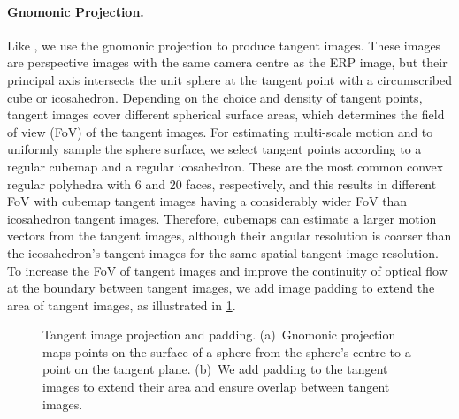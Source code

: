 \vspace{-1em}
\paragraph{Gnomonic Projection.}
Like \citet{ZhaoYZLBT2020}, we use the gnomonic projection to produce tangent images.
These images are perspective images with the same camera centre as the ERP image, but their principal axis intersects the unit sphere at the tangent point with a circumscribed cube or icosahedron.
Depending on the choice and density of tangent points, tangent images cover different spherical surface areas, which determines the field of view (FoV) of the tangent images.
For estimating multi-scale motion and to uniformly sample the sphere surface, we select tangent points according to a regular cubemap and a regular icosahedron.
These are the most common convex regular polyhedra with 6 and 20 faces, respectively, and this results in different FoV with cubemap tangent images having a considerably wider FoV than icosahedron tangent images.
Therefore, cubemaps can estimate a larger motion vectors from the tangent images, although their angular resolution is coarser than the icosahedron's tangent images for the same spatial tangent image resolution.
To increase the FoV of tangent images and improve the continuity of optical flow at the boundary between tangent images, we add image padding to extend the area of tangent images, as illustrated in \cref{fig:approach:projection}.


\begin{figure}[hbt!]
	\begin{center}
	\end{center}
	\caption{\label{fig:approach:projection}%
		Tangent image projection and padding.
		(a)~Gnomonic projection maps points on the surface of a sphere from the sphere's centre to a point on the tangent plane.
		(b)~We add padding to the tangent images to extend their area and ensure overlap between tangent images.
	}
\end{figure}


